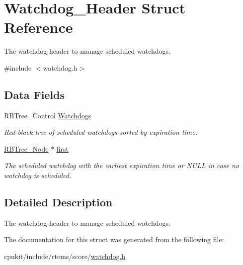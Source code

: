 \hypertarget{structWatchdog__Header}{}\section{Watchdog\+\_\+\+Header Struct Reference}
\label{structWatchdog__Header}


The watchdog header to manage scheduled watchdogs.  




{\ttfamily \#include $<$watchdog.\+h$>$}

\subsection*{Data Fields}
\begin{DoxyCompactItemize}
\item 
\mbox{\label{structWatchdog__Header_ab4afd2f68a2263404c2020e00c339e1c}} 
R\+B\+Tree\+\_\+\+Control \mbox{\hyperlink{structWatchdog__Header_ab4afd2f68a2263404c2020e00c339e1c}{Watchdogs}}
\begin{DoxyCompactList}\small\item\em Red-\/black tree of scheduled watchdogs sorted by expiration time. \end{DoxyCompactList}\item 
\mbox{\label{structWatchdog__Header_a4abd0a8de8c09c3839aed8832118c21a}} 
\mbox{\hyperlink{structRBTree__Node}{R\+B\+Tree\+\_\+\+Node}} $\ast$ \mbox{\hyperlink{structWatchdog__Header_a4abd0a8de8c09c3839aed8832118c21a}{first}}
\begin{DoxyCompactList}\small\item\em The scheduled watchdog with the earliest expiration time or N\+U\+LL in case no watchdog is scheduled. \end{DoxyCompactList}\end{DoxyCompactItemize}


\subsection{Detailed Description}
The watchdog header to manage scheduled watchdogs. 

The documentation for this struct was generated from the following file\+:\begin{DoxyCompactItemize}
\item 
cpukit/include/rtems/score/\mbox{\hyperlink{cpukit_2include_2rtems_2score_2watchdog_8h}{watchdog.\+h}}\end{DoxyCompactItemize}
